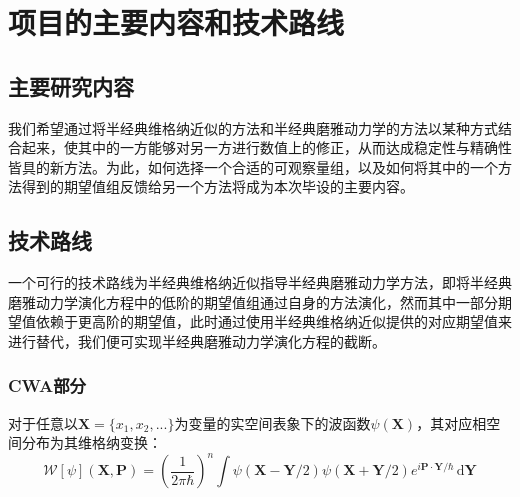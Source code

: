 \section{项目的主要内容和技术路线}

\subsection{主要研究内容}
我们希望通过将半经典维格纳近似的方法和半经典磨雅动力学的方法以某种方式结合起来，使其中的一方能够对另一方进行数值上的修正，从而达成稳定性与精确性皆具的新方法。为此，如何选择一个合适的可观察量组，以及如何将其中的一个方法得到的期望值组反馈给另一个方法将成为本次毕设的主要内容。

\subsection{技术路线}
一个可行的技术路线为半经典维格纳近似指导半经典磨雅动力学方法，即将半经典磨雅动力学演化方程中的低阶的期望值组通过自身的方法演化，然而其中一部分期望值依赖于更高阶的期望值，此时通过使用半经典维格纳近似提供的对应期望值来进行替代，我们便可实现半经典磨雅动力学演化方程的截断。
\subsubsection{CWA部分}
对于任意以$\boldsymbol{X} = \{x_1, x_2, ...\}$为变量的实空间表象下的波函数$\psi(\boldsymbol{X})$，其对应相空间分布为其维格纳变换：
\begin{equation}
\mathcal{W} \left[ \psi \right] (\boldsymbol{X}, \boldsymbol{P}) = \left(\frac{1}{2\pi \hbar}\right)^n \int \psi(\boldsymbol{X}-\boldsymbol{Y}/2) \psi(\boldsymbol{X} + \boldsymbol{Y}/2) e^{i \boldsymbol{P} \cdot \boldsymbol{Y} / \hbar} \, \mathrm{d}\boldsymbol{Y} 
\end{equation}


